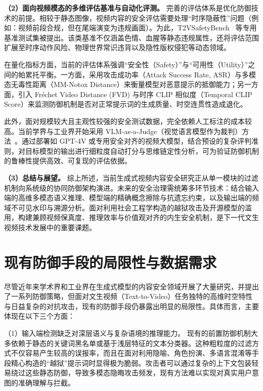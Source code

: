 \textbf{（2）面向视频模态的多维评估基准与自动化评测。}
完善的评估体系是优化防御技术的前提。相较于静态图像，视频内容的安全评估需要处理“时序隐蔽性”问题（例如：视频前段合规，但在尾端演变为违规画面）。为此，T2VSafetyBench~\cite{miao2024t2vsafetybench} 等专用基准测试集被提出。该类基准不仅涵盖色情、血腥等静态违规属性，还将评估范围扩展至时序动作风险、物理世界常识违背以及隐性版权侵犯等动态领域。

在量化指标方面，当前的评估体系强调“安全性（Safety）”与“可用性（Utility）”之间的帕累托平衡。一方面，采用攻击成功率（Attack Success Rate, ASR）与多模态无毒性距离（MM-Notox Distance）来衡量模型对恶意提示的抵御能力；另一方面，引入 Fréchet Video Distance (FVD) 与时序 CLIP 相似度（Temporal CLIP Score）来监测防御机制是否对正常提示词的生成质量、时空连贯性造成退化。

此外，面对规模较大且主观性较强的安全测试数据，完全依赖人工标注的成本较高。当前学界与工业界开始采用 VLM-as-a-Judge（视觉语言模型作为裁判）方法~\cite{dubey2024llama, openai2025gpt5}。通过部署如 GPT-4V 或专用安全对齐的视频大模型，结合预设的复杂评判准则，对目标模型的输出进行细粒度自动打分与思维链定性分析，可为验证防御机制的鲁棒性提供高效、可复现的评估依据。

\textbf{（3）总结与展望。}
综上所述，当前生成式视频内容安全研究正从单一模块的过滤机制向系统级的协同防御架构演进。未来的安全治理需统筹多环节技术：结合输入端的高维多模态语义推理、模型端的精确概念擦除与抗遗忘约束，以及输出端的频域不可见水印与溯源分析。面对利用社会工程学构造的越狱攻击及开源模型的滥用，构建兼顾视频保真度、推理效率与价值观对齐的内生安全机制，是下一代文生视频技术发展中的重要课题。

\section{现有防御手段的局限性与数据需求}

尽管近年来学术界和工业界在生成式模型的内容安全领域开展了大量研究，并提出了一系列防御策略，但面对文生视频（Text-to-Video）任务独特的高维时空特性与日益复杂的对抗攻击，现有的防御手段仍暴露出明显的局限性。具体而言，主要体现在以下三个方面：

（1）输入端检测缺乏对深层语义与复杂语境的推理能力。
现有的前置防御机制大多依赖于静态的关键词黑名单或基于浅层特征的文本分类器。这种粗粒度的过滤方式不仅容易产生较高的误报率，而且在面对利用隐喻、角色扮演、多语言混淆等手段精心构造的“越狱”提示词时显得极为脆弱。攻击者可以通过复杂的上下文包装轻易绕过这些静态防御，导致多模态隐晦攻击频发，现有方法难以实现对真实用户意图的准确理解与拦截。

